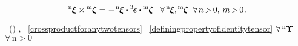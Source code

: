 \nopagebreak\vspace{-0.2em}\begin{equation}\label{crossproductforanytwotensors}
{^\mathrm{n}\hspace{-0.12ex}\bm{\xi}} \times \hspace{-0.12ex} {^\mathrm{m}\hspace{-0.12ex}\bm{\zeta}}
=
- \hspace{.25ex} {^\mathrm{n}\hspace{-0.12ex}\bm{\xi}} \dotp \levicivitatensor \dotp \hspace{-0.1ex} {^\mathrm{m}\hspace{-0.12ex}\bm{\zeta}}
\;\;\:
%
\forall \hspace{.4ex} {^\mathrm{n}\hspace{-0.12ex}\bm{\xi}} ,
\hspace{-0.12ex} {^\mathrm{m}\hspace{-0.12ex}\bm{\zeta}}
\;\;
\forall \hspace{.25ex} n \hspace{-0.25ex} > \hspace{-0.25ex} 0 , \,
m \hspace{-0.25ex} > \hspace{-0.25ex} 0
\hspace{.1ex} .
\end{equation}

\vspace{-0.1em}\noindent
{}\ru{\:---} ~() , ~\eqref{crossproductforanytwotensors} ~\eqref{definingpropertyofidentitytensor} ${\forall \, {^\mathrm{n}\hspace{-0.12ex}\bm{\Upsilon}}}$ ${\forall \,\mathrm{n \!>\! 0}}$

